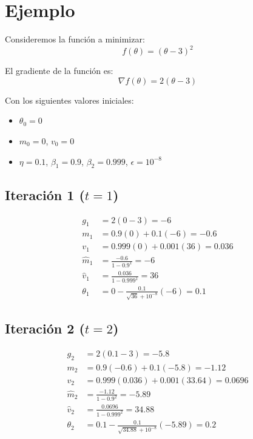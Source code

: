 \documentclass{article}
\begin{document}
\section*{Ejemplo}
Consideremos la función a minimizar:
\begin{equation}
	f(\theta) = (\theta - 3)^2
\end{equation}

El gradiente de la función es:
\begin{equation}
	\nabla f(\theta) = 2(\theta - 3)
\end{equation}

Con los siguientes valores iniciales:
\begin{itemize}
	\item $\theta_0 = 0$
	\item $m_0 = 0$, $v_0 = 0$
	\item $\eta = 0.1$, $\beta_1 = 0.9$, $\beta_2 = 0.999$, $\epsilon = 10^{-8}$
\end{itemize}

\subsection*{Iteración 1 ($t=1$)}
\begin{align*}
	g_1 &= 2(0 - 3) = -6 \\
	m_1 &= 0.9(0) + 0.1(-6) = -0.6 \\
	v_1 &= 0.999(0) + 0.001(36) = 0.036 \\
	\hat{m}_1 &= \frac{-0.6}{1 - 0.9^1} = -6 \\
	\hat{v}_1 &= \frac{0.036}{1 - 0.999^1} = 36 \\
	\theta_1 &= 0 - \frac{0.1}{\sqrt{36} + 10^{-8}} (-6) = 0.1
\end{align*}

\subsection*{Iteración 2 ($t=2$)}
\begin{align*}
	g_2 &= 2(0.1 - 3) = -5.8 \\
	m_2 &= 0.9(-0.6) + 0.1(-5.8) = -1.12 \\
	v_2 &= 0.999(0.036) + 0.001(33.64) = 0.0696 \\
	\hat{m}_2 &= \frac{-1.12}{1 - 0.9^2} = -5.89 \\
	\hat{v}_2 &= \frac{0.0696}{1 - 0.999^2} = 34.88 \\
	\theta_2 &= 0.1 - \frac{0.1}{\sqrt{34.88} + 10^{-8}} (-5.89) = 0.2
\end{align*}
\end{document}
